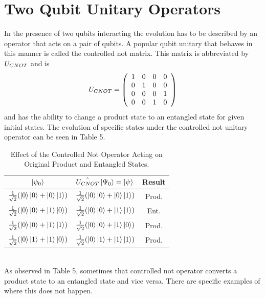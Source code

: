 \documentclass[twocolumn]{article}
\begin{document}
\section*{Two Qubit Unitary Operators}
In the presence of two qubits interacting the evolution has to be described by an operator that acts on a pair of qubits. A popular qubit unitary that behaves in this manner is called the controlled not matrix. This matrix is abbreviated by $U_{\tiny{CNOT}}$ and is
\begin{equation} \label{eq:25}
U_{\tiny{CNOT}}=
\left(\begin{array}{cccc}
1 & 0 & 0 & 0 \\
0 & 1 & 0 & 0 \\
0 & 0 & 0 & 1 \\
0 & 0 & 1 & 0 \\
\end{array}\right)
\end{equation}
and has the ability to change a product state to an entangled state for given initial states. The evolution of specific states under the controlled not unitary operator can be seen in Table 5.
\begin{table}[h!]
\begin{center}
\begin{tabular}{ |c|c|c| }
\hline $\ket{\psi_0}$ & $\hat{U_{CNOT}}\ket{\Psi_0}=\ket{\psi}$ & Result \\
\hline $\frac{1}{\sqrt{2}}(\ket{0}\ket{0}+\ket{0}\ket{1})$ & $\frac{1}{\sqrt{2}}(\ket{0}\ket{0}+\ket{0}\ket{1})$ & Prod. \\
\hline $\frac{1}{\sqrt{2}}(\ket{0}\ket{0}+\ket{1}\ket{0})$ & $\frac{1}{\sqrt{2}}(\ket{0}\ket{0}+\ket{1}\ket{1})$ & Ent. \\
\hline $\frac{1}{\sqrt{2}}(\ket{0}\ket{0}+\ket{1}\ket{1})$ & $\frac{1}{\sqrt{2}}(\ket{0}\ket{0}+\ket{1}\ket{0})$ & Prod. \\
\hline $\frac{1}{\sqrt{2}}(\ket{0}\ket{1}+\ket{1}\ket{0})$ & $\frac{1}{\sqrt{2}}(\ket{0}\ket{1}+\ket{1}\ket{1})$ & Prod. \\
\hline 
\end{tabular}
\caption{Effect of the Controlled Not Operator Acting on Original Product and Entangled States.}
\end{center}
\end{table} \\
As observed in Table 5, sometimes that controlled not operator converts a product state to an entangled state and vice versa. There are specific examples of where this does not happen.
\end{document}

